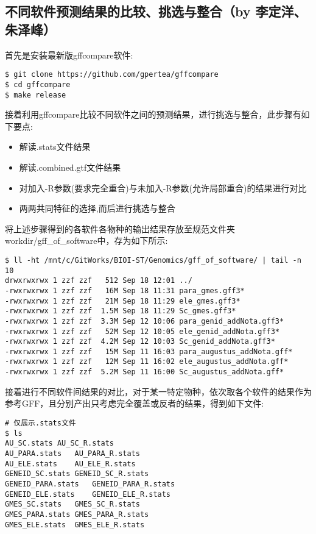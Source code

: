\documentclass[12pt]{ctexart}
\begin{document}
\subsection{不同软件预测结果的比较、挑选与整合（by 李定洋、朱泽峰）}

首先是安装最新版gffcompare软件:

\begin{lstlisting}
$ git clone https://github.com/gpertea/gffcompare
$ cd gffcompare
$ make release
\end{lstlisting}

接着利用gffcompare比较不同软件之间的预测结果，进行挑选与整合，此步骤有如下要点:

\begin{itemize}
    \item 解读.stats文件结果
    \item 解读.combined.gtf文件结果
    \item 对加入-R参数(要求完全重合)与未加入-R参数(允许局部重合)的结果进行对比
    \item 两两共同特征的选择,而后进行挑选与整合
\end{itemize}

将上述步骤得到的各软件各物种的输出结果存放至规范文件夹workdir/gff\_of\_software中，存为如下所示:

\begin{lstlisting}
$ ll -ht /mnt/c/GitWorks/BIOI-ST/Genomics/gff_of_software/ | tail -n 10
drwxrwxrwx 1 zzf zzf   512 Sep 18 12:01 ../
-rwxrwxrwx 1 zzf zzf   16M Sep 18 11:31 para_gmes.gff3*
-rwxrwxrwx 1 zzf zzf   21M Sep 18 11:29 ele_gmes.gff3*
-rwxrwxrwx 1 zzf zzf  1.5M Sep 18 11:29 Sc_gmes.gff3*
-rwxrwxrwx 1 zzf zzf  3.3M Sep 12 10:06 para_genid_addNota.gff3*
-rwxrwxrwx 1 zzf zzf   52M Sep 12 10:05 ele_genid_addNota.gff3*
-rwxrwxrwx 1 zzf zzf  4.2M Sep 12 10:03 Sc_genid_addNota.gff3*
-rwxrwxrwx 1 zzf zzf   15M Sep 11 16:03 para_augustus_addNota.gff*
-rwxrwxrwx 1 zzf zzf   12M Sep 11 16:02 ele_augustus_addNota.gff*
-rwxrwxrwx 1 zzf zzf  5.2M Sep 11 16:00 Sc_augustus_addNota.gff*
\end{lstlisting}

接着进行不同软件间结果的对比，对于某一特定物种，依次取各个软件的结果作为参考GFF，且分别产出只考虑完全覆盖或反者的结果，得到如下文件:

\begin{lstlisting}
# 仅展示.stats文件
$ ls
AU_SC.stats AU_SC_R.stats 
AU_PARA.stats   AU_PARA_R.stats 
AU_ELE.stats    AU_ELE_R.stats
GENEID_SC.stats GENEID_SC_R.stats 
GENEID_PARA.stats   GENEID_PARA_R.stats 
GENEID_ELE.stats    GENEID_ELE_R.stats
GMES_SC.stats   GMES_SC_R.stats 
GMES_PARA.stats GMES_PARA_R.stats 
GMES_ELE.stats  GMES_ELE_R.stats
\end{lstlisting}
\end{document}
